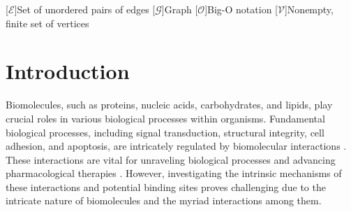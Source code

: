 \documentclass[Ingles]{phdthesis}
\begin{document}
\clearpage



\begin{acronym}
  [\ensuremath{\mathcal{E}}]{Set of unordered pairs of edges}
  [\ensuremath{\mathcal{G}}]{Graph}
  [\ensuremath{\mathcal{O}}]{Big-O notation}
  [\ensuremath{\mathcal{V}}]{Nonempty, finite set of vertices}
\end{acronym}

\clearpage

\tableofcontents

\fimdaspaginasiniciais



\chapter{Introduction}

Biomolecules, such as proteins, nucleic acids, carbohydrates, and lipids, play crucial roles in various biological processes within organisms. Fundamental biological processes, including signal transduction, structural integrity, cell adhesion, and apoptosis, are intricately regulated by biomolecular interactions \cite{sotriffer2002,henrich2010,kozlikova2016}. These interactions are vital for unraveling biological processes and advancing pharmacological therapies \cite{henrich2010}. However, investigating the intrinsic mechanisms of these interactions and potential binding sites proves challenging due to the intricate nature of biomolecules and the myriad interactions among them.
\end{document}
